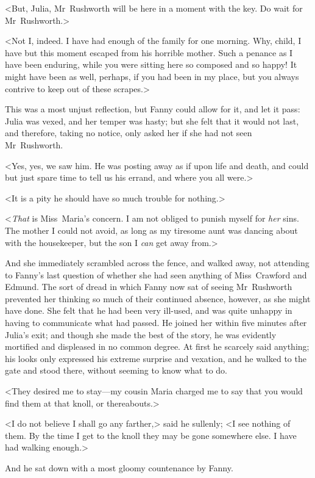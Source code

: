 <But, Julia, Mr~Rushworth will be here in a moment with the key. Do wait for Mr~Rushworth.>

<Not I, indeed. I have had enough of the family for one morning. Why, child, I have but this moment escaped from his horrible mother. Such a penance as I have been enduring, while you were sitting here so composed and so happy! It might have been as well, perhaps, if you had been in my place, but you always contrive to keep out of these scrapes.>

This was a most unjust reflection, but Fanny could allow for it, and let it pass: Julia was vexed, and her temper was hasty; but she felt that it would not last, and therefore, taking no notice, only asked her if she had not seen Mr~Rushworth.

<Yes, yes, we saw him. He was posting away as if upon life and death, and could but just spare time to tell us his errand, and where you all were.>

<It is a pity he should have so much trouble for nothing.>

<\textit{That}  is Miss~Maria's concern. I am not obliged to punish myself for \textit{her}  sins. The mother I could not avoid, as long as my tiresome aunt was dancing about with the housekeeper, but the son I \textit{can}  get away from.>

And she immediately scrambled across the fence, and walked away, not attending to Fanny's last question of whether she had seen anything of Miss~Crawford and Edmund. The sort of dread in which Fanny now sat of seeing Mr~Rushworth prevented her thinking so much of their continued absence, however, as she might have done. She felt that he had been very ill-used, and was quite unhappy in having to communicate what had passed. He joined her within five minutes after Julia's exit; and though she made the best of the story, he was evidently mortified and displeased in no common degree. At first he scarcely said anything; his looks only expressed his extreme surprise and vexation, and he walked to the gate and stood there, without seeming to know what to do.

<They desired me to stay—my cousin Maria charged me to say that you would find them at that knoll, or thereabouts.>

<I do not believe I shall go any farther,> said he sullenly; <I see nothing of them. By the time I get to the knoll they may be gone somewhere else. I have had walking enough.>

And he sat down with a most gloomy countenance by Fanny.


